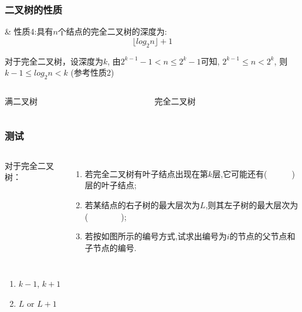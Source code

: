\begin{frame}[fragile]
  \frametitle{二叉树的性质}
  \begin{easylist}
  & 性质4:具有$n$个结点的完全二叉树的深度为:
    \[ \biggl\lfloor {log_2 n} \biggr\rfloor + 1 \] 
  \end{easylist}
  
  \small
  对于完全二叉树，设深度为$k$, 由$2^{k-1}-1 < n \leq 2^k - 1$可知,
  $2^{k-1} \leq n <2^k$, 则 $k-1 \leq log_2n < k$
  (参考性质2)
  
  \begin{columns}[T]
    \begin{column}{0.45\linewidth}      
      
      满二叉树
    \end{column}
    \begin{column}{0.45\linewidth}
      
      完全二叉树
    \end{column}
  \end{columns}
\end{frame}







\begin{frame}[fragile]
  \frametitle{测试}

\begin{columns}[T]
    对于完全二叉树：
  \begin{enumerate}
  \item 若完全二叉树有叶子结点出现在第$k$层,它可能还有(~~~~~~)层的叶子结点;
  \item 若某结点的右子树的最大层次为$L$,则其左子树的最大层次为(~~~~~~~~);
  \item 若按如图所示的编号方式,试求出编号为$i$的节点的父节点和子节点的编号.
  \end{enumerate}

\end{columns}

\pause
\begin{enumerate}
\item $k-1$, $k+1$
\item $L$ or $L+1$
\end{enumerate}
\end{frame}


